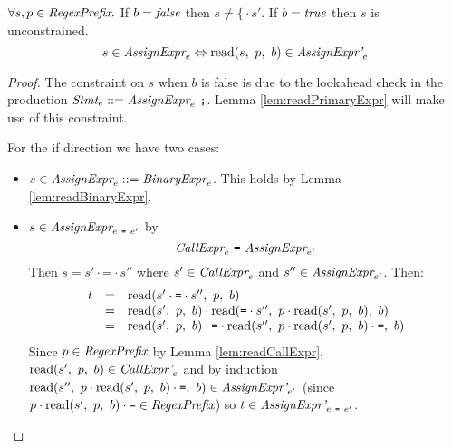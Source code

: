 \documentclass[onecolumn]{sigplanconf-onecolumn}
\begin{document}
\begin{lemma}\mbox{}
  
  \( \forall s, p \in \textit{RegexPrefix}. \)
  If \( b = \textit{false} \) then \( s \not = \texttt{\{} \cdot s' \). If \(
  b = \textit{true} \) then \( s \) is unconstrained.
  \[ 
  s \in \textit{AssignExpr}_{e} \Leftrightarrow 
  \textrm{read}(s,~p,~b) \in \textit{AssignExpr'}_{e} 
  \]
  
\end{lemma}
\begin{proof}
  The constraint on \( s \) when \( b \) is false is due to the
  lookahead check in the production \( \textit{Stmt}_{e} ::=
  \textit{AssignExpr}_{e}~\texttt{;} \). Lemma \ref{lem:readPrimaryExpr}
  will make use of this constraint.

  For the if direction we have
  two cases:
  \begin{itemize}
  \item \( s \in \textit{AssignExpr}_{e} ::=
    \textit{BinaryExpr}_{e} \). This holds by Lemma
    \ref{lem:readBinaryExpr}.
    
  \item \( s \in \textit{AssignExpr}_{e~\texttt{=}~e'} \) by
    \[ 
    \textit{CallExpr}_{e} ~\texttt{=}~
    \textit{AssignExpr}_{e'} 
    \]
    Then \( s = s' \cdot \texttt{=} \cdot s'' \) where \( s' \in
    \textit{CallExpr}_{e} \) and \( s'' \in
    \textit{AssignExpr}_{e'} \). Then:
    \[
    \begin{array}{rcl}
      t &=& \textrm{read}(s' \cdot \texttt{=} \cdot s'',~p,~b)
      \\
      &=& \textrm{read}(s',~p,~b)
      \cdot \textrm{read}(\texttt{=}\cdot s'',~p \cdot \textrm{read}(s',~p,~b),~b)
      \\
      &=& \textrm{read}(s',~p,~b) \cdot \texttt{=} \cdot
      \textrm{read}(s'',~p \cdot \textrm{read}(s',~p,~b) \cdot \texttt{=},~b)
    \end{array}
    \]
    Since \( p \in \textit{RegexPrefix} \) by Lemma
    \ref{lem:readCallExpr}, \( \textrm{read}(s',~p,~b) \in
    \textit{CallExpr'}_{e} \) and by induction \( \textrm{read}(s'',~p
      \cdot \textrm{read}(s',~p,~b) \cdot \texttt{=},~b) \in
    \textit{AssignExpr'}_{e'} \) 
    (since \( p \cdot \textrm{read}(s',~p,~b) \cdot \texttt{=} \in \textit{RegexPrefix} \)) so \( t \in
    \textit{AssignExpr'}_{e~\texttt{=}~e'} \).
  \end{itemize}
\end{proof}
\end{document}

